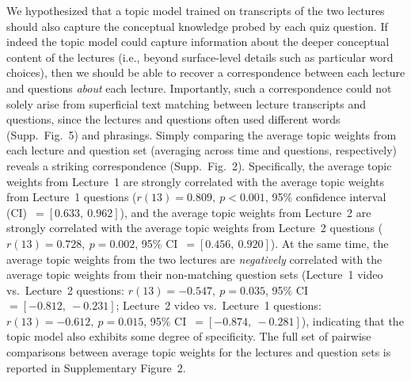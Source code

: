 \documentclass[10pt]{article}
\newcommand{\topicWeights}{2}
\newcommand{\jaccard}{5}
\begin{document}
We hypothesized that a topic model trained on transcripts of the two lectures
should also capture the conceptual knowledge probed by each quiz question. If
indeed the topic model could capture information about the deeper conceptual
content of the lectures (i.e., beyond surface-level details such as particular
word choices), then we should be able to recover a correspondence between each
lecture and questions \textit{about} each lecture. Importantly, such a
correspondence could not solely arise from superficial text matching between
lecture transcripts and questions, since the lectures and questions often used
different words (Supp.~Fig.~\jaccard) and phrasings. Simply comparing the
average topic weights from each lecture and question set (averaging across time
and questions, respectively) reveals a striking correspondence
(Supp.~Fig.~\topicWeights). Specifically, the average topic weights from Lecture~1 are
strongly correlated with the average topic weights from Lecture~1 questions
($r(13) = 0.809,~p < 0.001$, 95\% confidence interval (CI)~$= [0.633,~0.962]$),
and the average topic weights from Lecture~2 are strongly correlated with the
average topic weights from Lecture~2 questions ($r(13) = 0.728,~p = 0.002$,
95\% CI~$= [0.456,~0.920]$). At the same time, the average topic weights from
the two lectures are \textit{negatively} correlated with the average topic weights from their non-matching
question sets (Lecture~1 video vs.~Lecture~2 questions: $r(13) = -0.547,~p =
0.035$, 95\% CI~$= [-0.812, ~-0.231]$; Lecture~2 video vs.~Lecture~1 questions:
$r(13) = -0.612,~p = 0.015$, 95\% CI~$= [-0.874,~-0.281]$), indicating that the
topic model also exhibits some degree of specificity. The full set of pairwise
comparisons between average topic weights for the lectures and question sets is
reported in Supplementary Figure~\topicWeights.
\end{document}
